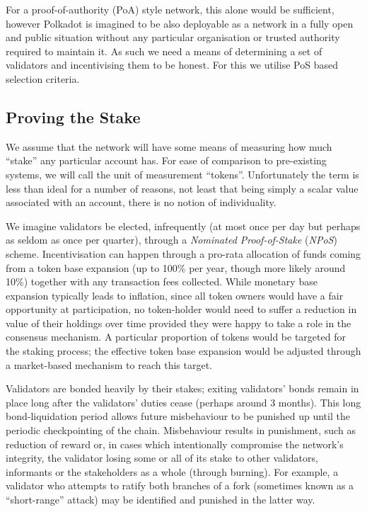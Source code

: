 \documentclass[9pt,oneside]{amsart}
\begin{document}
\begin{multicols}{2}
 For a proof-of-authority (PoA) style network, this alone would be sufficient, however Polkadot is imagined to be also deployable as a network in a fully open and public situation without any particular organisation or trusted authority required to maintain it. As such we need a means of determining a set of validators and incentivising them to be honest. For this we utilise PoS based selection criteria.

\subsection{Proving the Stake}\label{proving-the-stake}

 We assume that the network will have some means of measuring how much ``stake'' any particular account has. For ease of comparison to pre-existing systems, we will call the unit of measurement ``tokens''. Unfortunately the term is less than ideal for a number of reasons, not least that being simply a scalar value associated with an account, there is no notion of individuality.

 We imagine validators be elected, infrequently (at most once per day but perhaps as seldom as once per quarter), through a \textit{Nominated Proof-of-Stake} (\textit{NPoS}) scheme. Incentivisation can happen through a pro-rata allocation of funds coming from a token base expansion (up to 100\% per year, though more likely around 10\%) together with any transaction fees collected. While monetary base expansion typically leads to inflation, since all token owners would have a fair opportunity at participation, no token-holder would need to suffer a reduction in value of their holdings over time provided they were happy to take a role in the consensus mechanism. A particular proportion of tokens would be targeted for the staking process; the effective token base expansion would be adjusted through a market-based mechanism to reach this target.

 Validators are bonded heavily by their stakes; exiting validators' bonds remain in place long after the validators' duties cease (perhaps around 3 months). This long bond-liquidation period allows future misbehaviour to be punished up until the periodic checkpointing of the chain. Misbehaviour results in punishment, such as reduction of reward or, in cases which intentionally compromise the network's integrity, the validator losing some or all of its stake to other validators, informants or the stakeholders as a whole (through burning). For example, a validator who attempts to ratify both branches of a fork (sometimes known as a ``short-range'' attack) may be identified and punished in the latter way.


\end{multicols}
\end{document}
